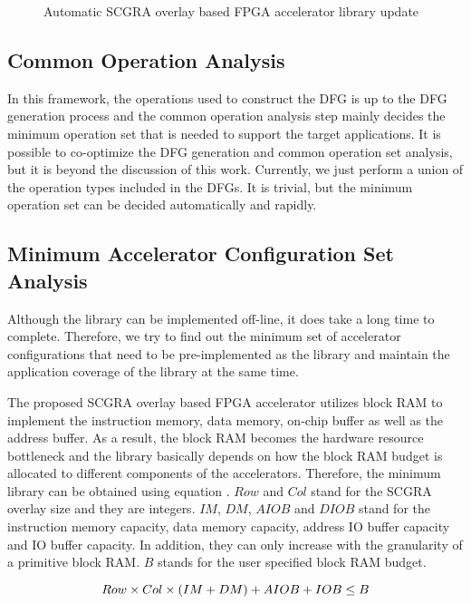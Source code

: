 \begin{figure}
\caption{Automatic SCGRA overlay based FPGA accelerator library update}
\label{fig:auto-lib-gen}
\end{figure}

\subsection{Common Operation Analysis}
In this framework, the operations used to construct the DFG is up to the DFG generation process and the common operation analysis step mainly decides the minimum operation set that is needed to support the target applications. It is possible to co-optimize the DFG generation and common operation set analysis, but it is beyond the discussion of this work. Currently, we just perform a union of the operation types included in the DFGs. It is trivial, but the minimum operation set can be decided automatically and rapidly.

\subsection{Minimum Accelerator Configuration Set Analysis}
Although the library can be implemented off-line, it does take a long time to complete.
Therefore, we try to find out the minimum set of accelerator configurations that need to be
pre-implemented as the library and maintain the application coverage of the library at the same
time. 

The proposed SCGRA overlay based FPGA accelerator utilizes
block RAM to implement the instruction memory, data memory, on-chip buffer as well as the address
buffer. As a result, the block RAM becomes the hardware resource bottleneck and the library basically depends on how
the block RAM budget is allocated to different components of the accelerators. Therefore, the
minimum library can be obtained using equation . $Row$ and $Col$ stand for the SCGRA
overlay size and they are integers. $IM$, $DM$, $AIOB$ and $DIOB$ stand for the instruction memory capacity,
data memory capacity, address IO buffer capacity and IO buffer capacity. In addition, they can only increase with the granularity of a primitive block RAM. $B$ stands for the user specified block RAM budget. 

\begin{equation} \label{eq:lib-gen}
    \footnotesize
    Row \times Col \times(IM + DM) + AIOB + IOB \leq B
\end{equation}

